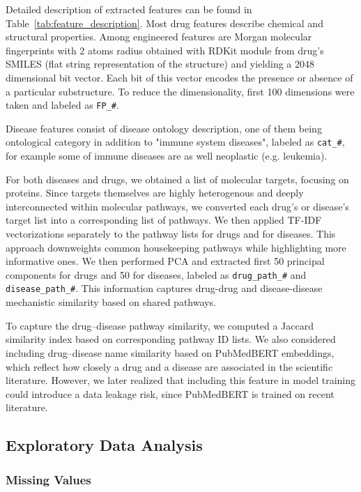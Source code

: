 Detailed description of extracted features can be found in Table~\ref{tab:feature_description}.
Most drug features describe chemical and structural properties. Among engineered features are Morgan molecular fingerprints with 2 atoms radius 
obtained with RDKit module from drug's SMILES (flat string representation of the structure) and yielding a 2048 dimensional bit vector. Each
bit of this vector encodes the presence or absence of a particular substructure. To reduce the dimensionality, 
first 100 dimensions were taken and labeled as \verb|FP_#|.

Disease features consist of disease ontology description, one of them being ontological category
in addition to "immune system diseases", labeled as \verb|cat_#|, for example some of immune diseases are as well 
neoplastic (e.g. leukemia).

For both diseases and drugs, we obtained a list of molecular targets, focusing on proteins. 
Since targets themselves are highly heterogenous and deeply interconnected
within molecular pathways, we converted each drug's or disease's target list into a corresponding list of pathways. 
We then applied TF-IDF vectorizations separately to the pathway lists for drugs and for diseases. 
This approach downweights common housekeeping pathways while highlighting more informative ones. 
We then performed PCA and extracted first 50 principal components for drugs and 50 for diseases, labeled as \verb|drug_path_#| and \verb|disease_path_#|. 
 This information captures drug-drug and disease-disease mechanistic similarity based on shared pathways.

 To capture the drug--disease pathway similarity, we computed a Jaccard similarity index based on corresponding pathway 
 ID lists. We also considered including drug--disease name similarity based on PubMedBERT embeddings, which reflect  how closely a drug and a disease are associated in the scientific literature.
 However, we later realized that including this feature in model training could introduce a data leakage risk, 
 since PubMedBERT is trained on recent literature.


\subsection{Exploratory Data Analysis}

\subsubsection{Missing Values}

